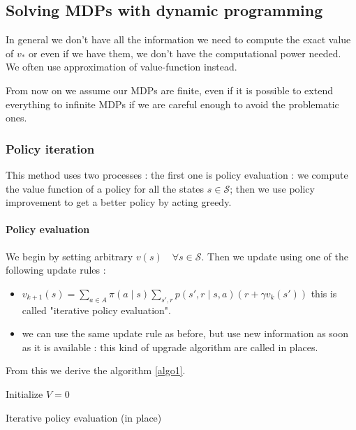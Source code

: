 \documentclass[14pt,a4paper]{article}
\theoremstyle{definition}
\begin{document}
\subsection{Solving MDPs with dynamic programming}

In general we don't have all the information we need to compute the exact value of $v_{*}$ or even if we have them, we don't have the computational 
power needed. We often use approximation of value-function instead.


From now on we assume our MDPs are finite, even if it is possible to extend everything to infinite MDPs if we are careful enough to avoid the problematic ones.

\subsubsection{Policy iteration}

This method uses two processes : the first one is policy evaluation : we compute the value function of a policy for all the states $s \in \mathcal{S} $; then we use policy improvement to get a better policy by acting greedy.
\paragraph{Policy evaluation} 


We begin by setting arbitrary $v(s) \quad \forall s \in \mathcal{S}$.
Then we update using one of the following update rules : 

\begin{itemize}
\item $v_{k+1}(s)=\sum_{a \in A}\pi(a \mid s)\sum_{s',r}p(s',r\mid s,a)(r+\gamma v_k(s'))$ \quad this is called "iterative policy evaluation".
\item we can use the same update rule as before, but use new information as soon as it is available : this kind of upgrade algorithm are called in places.
\end{itemize}

From this we derive the algorithm \ref{algo1}.


\begin{algorithm}
\label{algo1}

    Initialize $V = 0$\\
    
    \caption{Iterative policy evaluation (in place)}
\end{algorithm}
\end{document}
